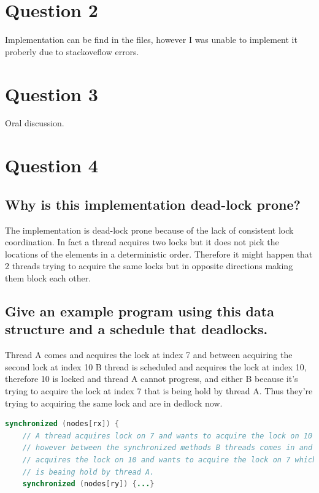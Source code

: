 \documentclass[format=acmsmall, review=false, screen=true]{acmart}
\begin{document}
\section{Question 2}

Implementation can be find in the files, however I was unable to implement it proberly due to stackoveflow errors.

\section{Question 3}

Oral discussion.

\section{Question 4}

\subsection{Why is this implementation dead-lock prone?}

The implementation is dead-lock prone because of the lack of consistent lock coordination.
In fact a thread acquires two locks but it does not pick the locations of the elements in a deterministic order. Therefore it might happen that 2 threads trying to acquire the same locks but in opposite directions making them block each other.

\subsection{Give an example program using this data structure and a schedule that deadlocks.}

Thread A comes and acquires the lock at index 7 and between acquiring the second lock at index 10 B thread is scheduled and acquires the lock at index 10, therefore 10 is locked and thread A cannot progress, and either B because it's trying to acquire the lock at index 7 that is being hold by thread A. Thus they're trying to acquiring the same lock and are in dedlock now.

\begin{lstlisting}[language=java]
synchronized (nodes[rx]) {
    // A thread acquires lock on 7 and wants to acquire the lock on 10
    // however between the synchronized methods B threads comes in and
    // acquires the lock on 10 and wants to acquire the lock on 7 which
    // is beaing hold by thread A.
    synchronized (nodes[ry]) {...}
\end{lstlisting}
\end{document}
